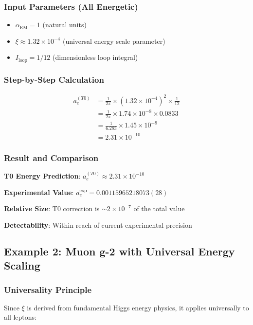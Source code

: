 \documentclass[12pt,a4paper]{article}
\newcommand{\alphaEM}{\alpha_{\text{EM}}}
\newcommand{\xipar}{\xi}
\begin{document}
	\subsubsection{Input Parameters (All Energetic)}
	\begin{itemize}
		\item $\alphaEM = 1$ (natural units)
		\item $\xipar \approx 1.32 \times 10^{-4}$ (universal energy scale parameter)
		\item $I_{\text{loop}} = 1/12$ (dimensionless loop integral)
	\end{itemize}
	
	\subsubsection{Step-by-Step Calculation}
	\begin{align}
		a_e^{(T0)} &= \frac{1}{2\pi} \times (1.32 \times 10^{-4})^2 \times \frac{1}{12} \\
		&= \frac{1}{2\pi} \times 1.74 \times 10^{-8} \times 0.0833 \\
		&= \frac{1}{6.283} \times 1.45 \times 10^{-9} \\
		&= 2.31 \times 10^{-10}
		\label{eq:electron_g2_calculation}
	\end{align}
	
	\subsubsection{Result and Comparison}
	\begin{tcolorbox}[colback=green!5!white,colframe=green!75!black,title=Electron g-2 Energy Prediction]
		\textbf{T0 Energy Prediction}: $a_e^{(T0)} \approx 2.31 \times 10^{-10}$
		
		\textbf{Experimental Value}: $a_e^{\text{exp}} = 0.00115965218073(28)$
		
		\textbf{Relative Size}: T0 correction is $\sim 2 \times 10^{-7}$ of the total value
		
		\textbf{Detectability}: Within reach of current experimental precision
	\end{tcolorbox}
	
	\subsection{Example 2: Muon g-2 with Universal Energy Scaling}
	\label{subsec:muon_g2_energy}
	
	\subsubsection{Universality Principle}
	Since $\xipar$ is derived from fundamental Higgs energy physics, it applies universally to all leptons:
	
\end{document}
